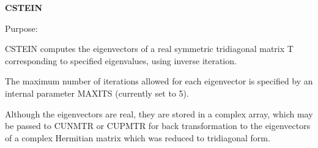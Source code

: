 {\bfseries C\+S\+T\+E\+I\+N} 

 \begin{DoxyParagraph}{Purpose\+: }
\begin{DoxyVerb} CSTEIN computes the eigenvectors of a real symmetric tridiagonal
 matrix T corresponding to specified eigenvalues, using inverse
 iteration.

 The maximum number of iterations allowed for each eigenvector is
 specified by an internal parameter MAXITS (currently set to 5).

 Although the eigenvectors are real, they are stored in a complex
 array, which may be passed to CUNMTR or CUPMTR for back
 transformation to the eigenvectors of a complex Hermitian matrix
 which was reduced to tridiagonal form.\end{DoxyVerb}
 
\end{DoxyParagraph}

